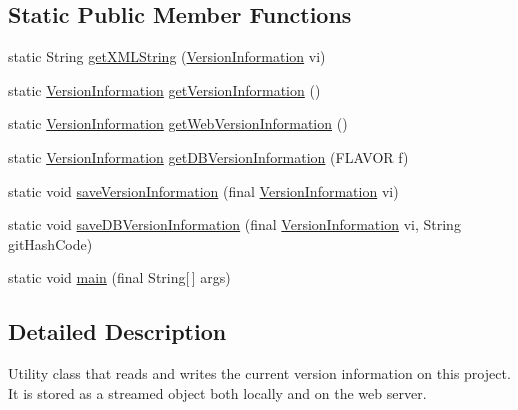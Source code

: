 \subsection*{Static Public Member Functions}
\begin{DoxyCompactItemize}
\item 
static String \hyperlink{classgov_1_1fnal_1_1ppd_1_1dd_1_1util_1_1version_1_1VersionInformation_afa85eafcdf7b652d768aef96624738d4}{get\-X\-M\-L\-String} (\hyperlink{classgov_1_1fnal_1_1ppd_1_1dd_1_1util_1_1version_1_1VersionInformation}{Version\-Information} vi)
\item 
static \hyperlink{classgov_1_1fnal_1_1ppd_1_1dd_1_1util_1_1version_1_1VersionInformation}{Version\-Information} \hyperlink{classgov_1_1fnal_1_1ppd_1_1dd_1_1util_1_1version_1_1VersionInformation_ae3b271fb533ff507acae7aeccbe4ffef}{get\-Version\-Information} ()
\item 
static \hyperlink{classgov_1_1fnal_1_1ppd_1_1dd_1_1util_1_1version_1_1VersionInformation}{Version\-Information} \hyperlink{classgov_1_1fnal_1_1ppd_1_1dd_1_1util_1_1version_1_1VersionInformation_a35a9492897005a8a48cfd9289dc9edff}{get\-Web\-Version\-Information} ()
\item 
static \hyperlink{classgov_1_1fnal_1_1ppd_1_1dd_1_1util_1_1version_1_1VersionInformation}{Version\-Information} \hyperlink{classgov_1_1fnal_1_1ppd_1_1dd_1_1util_1_1version_1_1VersionInformation_afccd7186968a5736b034f8600df1287b}{get\-D\-B\-Version\-Information} (F\-L\-A\-V\-O\-R f)
\item 
static void \hyperlink{classgov_1_1fnal_1_1ppd_1_1dd_1_1util_1_1version_1_1VersionInformation_ad92c421c9291308bc422e9b383b0fc4d}{save\-Version\-Information} (final \hyperlink{classgov_1_1fnal_1_1ppd_1_1dd_1_1util_1_1version_1_1VersionInformation}{Version\-Information} vi)
\item 
static void \hyperlink{classgov_1_1fnal_1_1ppd_1_1dd_1_1util_1_1version_1_1VersionInformation_afaa42342d99f1517e1a672b24f1f725a}{save\-D\-B\-Version\-Information} (final \hyperlink{classgov_1_1fnal_1_1ppd_1_1dd_1_1util_1_1version_1_1VersionInformation}{Version\-Information} vi, String git\-Hash\-Code)
\item 
static void \hyperlink{classgov_1_1fnal_1_1ppd_1_1dd_1_1util_1_1version_1_1VersionInformation_a1f1c0fa39067225a137925368674d424}{main} (final String\mbox{[}$\,$\mbox{]} args)
\end{DoxyCompactItemize}


\subsection{Detailed Description}
Utility class that reads and writes the current version information on this project. It is stored as a streamed object both locally and on the web server. 


